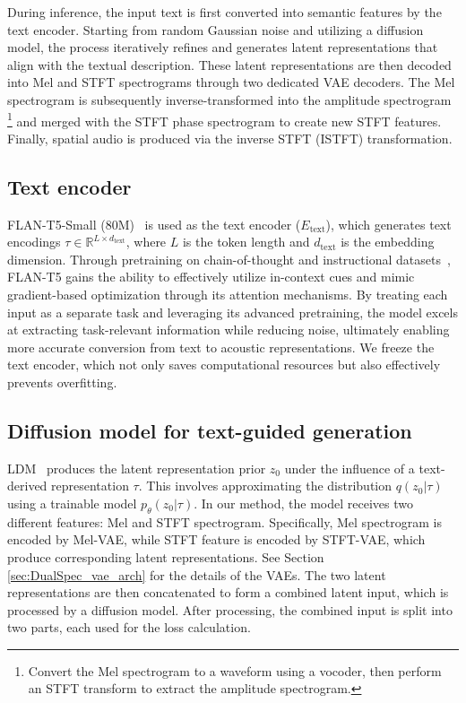 \documentclass{IEEEtran}
\begin{document}
During inference, the input text is first converted into semantic features by the text encoder. Starting from random Gaussian noise and utilizing a diffusion model, the process iteratively refines and generates latent representations that align with the textual description. These latent representations are then decoded into Mel and STFT spectrograms through two dedicated VAE decoders. The Mel spectrogram is subsequently inverse-transformed into the amplitude spectrogram \footnote{Convert the Mel spectrogram to a waveform using a vocoder, then perform an STFT transform to extract the amplitude spectrogram.} and merged with the STFT phase spectrogram to create new STFT features. Finally, spatial audio is produced via the inverse STFT (ISTFT) transformation.

\subsection{Text encoder}


FLAN-T5-Small (80M)~\cite{chung2024scaling} is used as the text encoder ($E_{\text{text}}$), which generates text encodings $\tau \in \mathbb{R}^{L \times d_{\text{text}}}$, where $L$ is the token length and $d_{\text{text}}$ is the embedding dimension. Through pretraining on chain-of-thought and instructional datasets~\cite{dai2022can}, FLAN-T5 gains the ability to effectively utilize in-context cues and mimic gradient-based optimization through its attention mechanisms. By treating each input as a separate task and leveraging its advanced pretraining, the model excels at extracting task-relevant information while reducing noise, ultimately enabling more accurate conversion from text to acoustic representations.
{We freeze the text encoder, which not only saves computational resources but also effectively prevents overfitting.}



\subsection{Diffusion model for text-guided generation}

LDM~\cite{rombach2022high}  produces the latent representation prior $z_{0}$ under the influence of a text-derived representation $\tau$. This involves approximating the distribution $q(z_{0} | \tau)$ using a trainable model $p_{\theta}(z_{0} | \tau)$. In our method, the model receives two different features: Mel and STFT spectrogram. Specifically, Mel spectrogram is encoded by Mel-VAE, while STFT feature is encoded by STFT-VAE, which produce corresponding latent representations. See Section \ref{sec:DualSpec_vae_arch} for the details of the VAEs. The two latent representations are then concatenated to form a combined latent input, which is processed by a diffusion model. After processing, the combined input is split into two parts, each used for the loss calculation.
\end{document}
